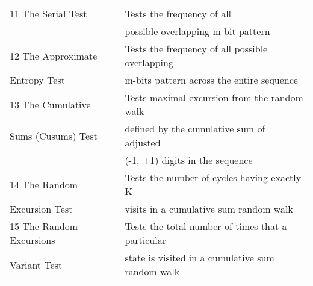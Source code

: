 \begin{tabular}{|l|l|}
\hline
11 The Serial Test & Tests the frequency of all \\
                  & possible overlapping m-bit pattern \\
\hline
12 The Approximate & Tests the frequency of all possible overlapping\\
Entropy Test &  m-bits pattern across the entire sequence \\
\hline
13 The Cumulative & Tests maximal excursion from the random walk \\
Sums (Cusums) Test & defined by the cumulative sum of adjusted \\
                  & (-1, +1) digits in the sequence \\
\hline
14 The Random & Tests the number of cycles having exactly K \\
Excursion Test & visits in a cumulative sum random walk \\
\hline
15 The Random Excursions & Tests the total number of times that a particular \\
Variant Test & state is visited in a cumulative sum random walk  \\

 
\hline

\end{tabular}
